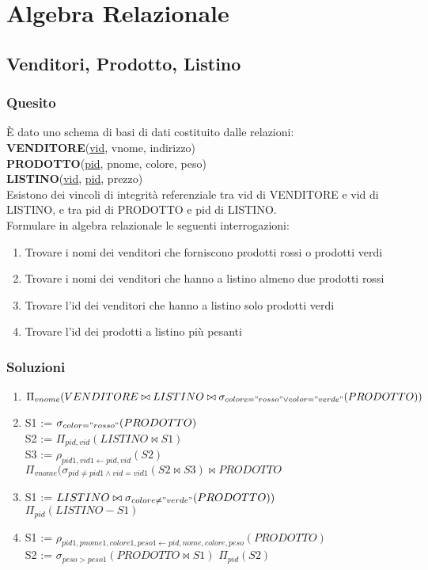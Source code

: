 \section{Algebra Relazionale}
\subsection{Venditori, Prodotto, Listino}
\subsubsection{Quesito}

È dato uno schema di basi di dati costituito dalle relazioni:
\\
\indent \textbf{VENDITORE}(\underline{vid}, vnome, indirizzo) \\
\indent \textbf{PRODOTTO}(\underline{pid}, pnome, colore, peso) \\
\indent \textbf{LISTINO}(\underline{vid}, \underline{pid}, prezzo) \\

Esistono dei vincoli di integrità referenziale tra vid di VENDITORE
e vid di LISTINO, e tra pid di PRODOTTO e pid di LISTINO. \\

Formulare in algebra relazionale le seguenti interrogazioni:
\begin{enumerate}
  \item Trovare i nomi dei venditori che forniscono prodotti rossi o prodotti verdi
  \item Trovare i nomi dei venditori che hanno a listino almeno due prodotti rossi
  \item Trovare l'id dei venditori che hanno a listino solo prodotti verdi
  \item Trovare l'id dei prodotti a listino più pesanti
\end{enumerate}

\subsubsection{Soluzioni}

\begin{enumerate}
  \item $\Pi_{vnome}(VENDITORE \bowtie LISTINO \bowtie \sigma_{colore="rosso" \lor color="verde"}(PRODOTTO))$
  \item
    S1 := $\sigma_{color="rosso"}(PRODOTTO)$ \\
    S2 := $\Pi_{pid,vid}(LISTINO \bowtie S1)$ \\
    S3 := $\rho_{pid1,vid1 \leftarrow pid,vid}(S2)$ \\
    $\Pi_{vnome}(\sigma_{pid \neq pid1 \land vid = vid1}(S2 \bowtie S3) \bowtie PRODOTTO$
  \item
    S1 := $LISTINO \bowtie \sigma_{colore \neq "verde"} (PRODOTTO))$ \\
    $\Pi_{pid}(LISTINO - S1)$
  \item
    S1 := $\rho_{pid1,pnome1,colore1,peso1 \leftarrow pid,nome,colore,peso}(PRODOTTO)$ \\
    S2 := $\sigma_{peso>peso1}(PRODOTTO \bowtie S1)$
    $\Pi_{pid}(S2)$
\end{enumerate}